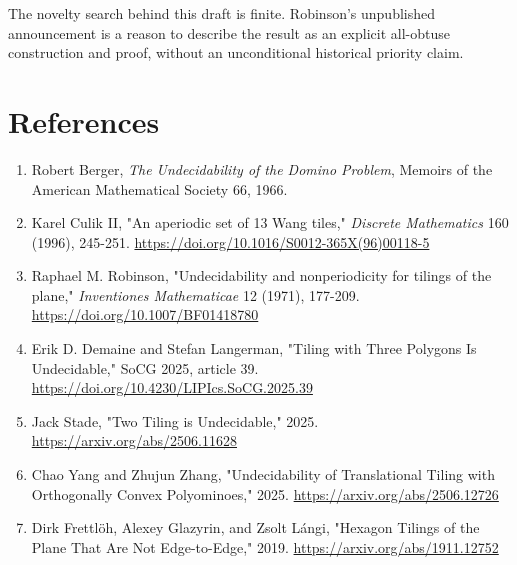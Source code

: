 \documentclass[11pt]{article}
\begin{document}
The novelty search behind this draft is finite. Robinson's unpublished
announcement is a reason to describe the result as an explicit all-obtuse
construction and proof, without an unconditional historical priority claim.

\section*{References}

\begin{enumerate}
\item Robert Berger, \emph{The Undecidability of the Domino Problem}, Memoirs of the
   American Mathematical Society 66, 1966.
\item Karel Culik II, "An aperiodic set of 13 Wang tiles,"
   \emph{Discrete Mathematics} 160 (1996), 245-251.
   \url{https://doi.org/10.1016/S0012-365X(96)00118-5}
\item Raphael M. Robinson, "Undecidability and nonperiodicity for tilings of the
   plane," \emph{Inventiones Mathematicae} 12 (1971), 177-209.
   \url{https://doi.org/10.1007/BF01418780}
\item Erik D. Demaine and Stefan Langerman, "Tiling with Three Polygons Is
   Undecidable," SoCG 2025, article 39.
   \url{https://doi.org/10.4230/LIPIcs.SoCG.2025.39}
\item Jack Stade, "Two Tiling is Undecidable," 2025.
   \url{https://arxiv.org/abs/2506.11628}
\item Chao Yang and Zhujun Zhang, "Undecidability of Translational Tiling with
   Orthogonally Convex Polyominoes," 2025.
   \url{https://arxiv.org/abs/2506.12726}
\item Dirk Frettlöh, Alexey Glazyrin, and Zsolt Lángi, "Hexagon Tilings of the
   Plane That Are Not Edge-to-Edge," 2019.
   \url{https://arxiv.org/abs/1911.12752}
\end{enumerate}
\end{document}
